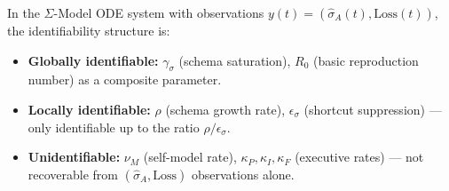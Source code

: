 \begin{theorem}
\label{thm:identifiability}
In the $\Sigma$-Model ODE system with observations
$y(t) = (\hat{\sigma}_A(t), \mathrm{Loss}(t))$, the identifiability
structure is:
\begin{itemize}
\item \textbf{Globally identifiable:} $\gamma_\sigma$ (schema saturation),
  $R_0$ (basic reproduction number) as a composite parameter.
\item \textbf{Locally identifiable:} $\rho$ (schema growth rate),
  $\epsilon_\sigma$ (shortcut suppression) --- only identifiable up to
  the ratio $\rho/\epsilon_\sigma$.
\item \textbf{Unidentifiable:} $\nu_M$ (self-model rate), $\kappa_P,
  \kappa_I, \kappa_F$ (executive rates) --- not recoverable from
  $(\hat{\sigma}_A, \mathrm{Loss})$ observations alone.
\end{itemize}
\end{theorem}

